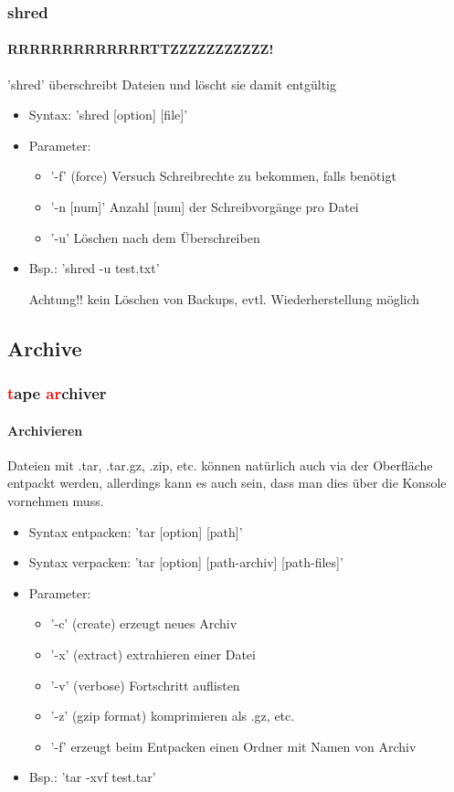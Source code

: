 \documentclass[12pt,utf8]{beamer}
\begin{document}
\begin{frame}
\frametitle{shred}
\framesubtitle{RRRRRRRRRRRRRTTZZZZZZZZZZZ!}
'shred' überschreibt Dateien und löscht sie damit entgültig
\begin{itemize}
	\item Syntax: 'shred [option] [file]'
	\item Parameter:
	\begin{itemize}[<+->]
		\item '-f' (force) Versuch Schreibrechte zu bekommen, falls benötigt
		\item '-n [num]' Anzahl [num] der Schreibvorgänge pro Datei
		\item '-u' Löschen nach dem Überschreiben
	\end{itemize}
	\item Bsp.: 'shred -u test.txt'
	\item [Achtung!!] kein Löschen von Backups, evtl. Wiederherstellung möglich
\end{itemize}
\end{frame}

\subsection{Archive}
\begin{frame}
\frametitle{\textcolor{red}{t}ape \textcolor{red}{ar}chiver}
\framesubtitle{Archivieren}
Dateien mit .tar, .tar.gz, .zip, etc. können natürlich auch via der Oberfläche entpackt werden, allerdings kann es auch sein, dass man dies über die Konsole vornehmen muss.
\begin{itemize}[<+->]
	\item Syntax entpacken: 'tar [option] [path]'
	\item Syntax verpacken: 'tar [option] [path-archiv] [path-files]'
	\item Parameter:
	\begin{itemize}[<+->]
		\item '-c' (create) erzeugt neues Archiv
		\item '-x' (extract) extrahieren einer Datei
		\item '-v' (verbose) Fortschritt auflisten
		\item '-z' (gzip format) komprimieren als .gz, etc.
		\item '-f' erzeugt beim Entpacken einen Ordner mit Namen von Archiv
	\end{itemize}
	\item Bsp.: 'tar -xvf test.tar'
\end{itemize}
\end{frame}
\end{document}
